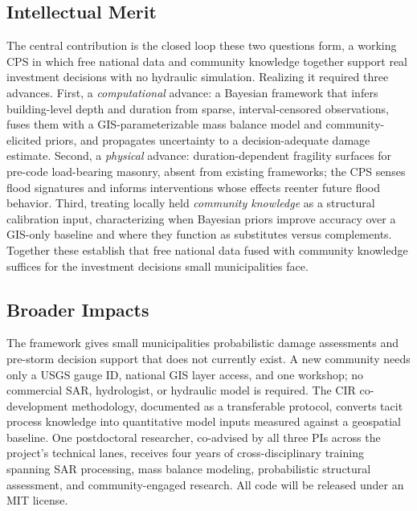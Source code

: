\documentclass[11pt]{article}
\begin{document}
\subsection{Intellectual Merit}
\vspace{-0.3cm}
The central contribution is the closed loop these two questions form, a working
CPS in which free national data and community knowledge together support real
investment decisions with no hydraulic simulation.
Realizing it required three advances.
First, a \textit{computational} advance: a Bayesian framework that infers
building-level depth and duration from sparse, interval-censored observations,
fuses them with a GIS-parameterizable mass balance model and community-elicited
priors, and propagates uncertainty to a decision-adequate damage estimate.
Second, a \textit{physical} advance: duration-dependent fragility surfaces for
pre-code load-bearing masonry, absent from existing frameworks; the CPS senses
flood signatures and informs interventions whose effects reenter future flood
behavior.
Third, treating locally held \textit{community knowledge} as a structural
calibration input, characterizing when Bayesian priors improve accuracy over a
GIS-only baseline and where they function as substitutes versus complements.
Together these establish that free national data fused with community knowledge
suffices for the investment decisions small municipalities face.

\vspace{-0.5cm}
\subsection{Broader Impacts}
\vspace{-0.3cm}
The framework gives small municipalities probabilistic damage assessments and
pre-storm decision support that does not currently exist. A new community needs
only a USGS gauge ID, national GIS layer access, and one workshop; no commercial
SAR, hydrologist, or hydraulic model is required.
The CIR co-development methodology, documented as a transferable protocol,
converts tacit process knowledge into quantitative model inputs measured against
a geospatial baseline.
One postdoctoral researcher, co-advised by all three PIs across the project's
technical lanes, receives four years of cross-disciplinary training spanning
SAR processing, mass balance modeling, probabilistic structural assessment,
and community-engaged research. All code will be released under an MIT license.
\end{document}

